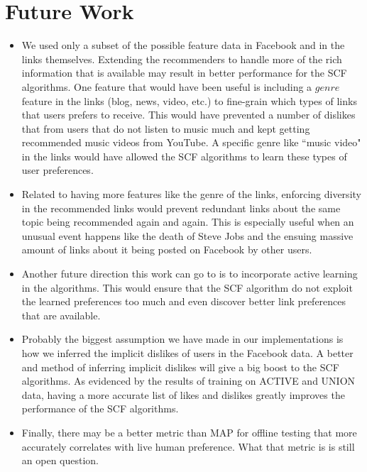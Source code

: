 \section{Future Work}
\begin{itemize}
\item{We used only a subset of the possible feature data in Facebook and in the links themselves. Extending the recommenders to handle more of the rich information that is available may result in better performance for the SCF algorithms. One feature that would have been useful is including a $genre$ feature in the links (blog, news, video, etc.) to  fine-grain which types of links that users prefers to receive. This would have prevented a number of dislikes that from users that do not listen to music much and kept getting recommended music videos from YouTube. A specific genre like ``music video" in the links would have allowed the SCF algorithms to learn these types of user preferences.}
\item{Related to having more features like the genre of the links, enforcing diversity in the recommended links would prevent redundant  links about the same topic being recommended again and again. This is especially useful when an unusual event happens like the death of Steve Jobs and the ensuing massive amount of links about it being posted on Facebook by other users.}
\item{Another future direction this work can go to is to incorporate active learning in the algorithms. This would ensure that the SCF algorithm do not exploit the learned preferences too much and even discover better link preferences that are available.}
\item{Probably the biggest assumption we have made in our implementations is how we inferred the implicit dislikes of users in the Facebook data. A better and method of inferring implicit dislikes will give a big boost to the SCF algorithms. As evidenced by the results of training on ACTIVE and UNION data, having a more accurate list of likes and dislikes greatly improves the performance of the SCF algorithms. }
\item{Finally, there may be a better metric than MAP for offline testing that more accurately correlates with live human preference. What that metric is is still an open question.}
\end{itemize}

